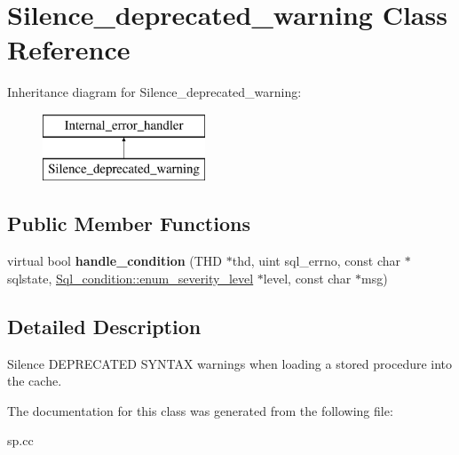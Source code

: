 \hypertarget{classSilence__deprecated__warning}{}\section{Silence\+\_\+deprecated\+\_\+warning Class Reference}
\label{classSilence__deprecated__warning}
Inheritance diagram for Silence\+\_\+deprecated\+\_\+warning\+:\begin{figure}[H]
\begin{center}
\leavevmode
\includegraphics[height=2.000000cm]{classSilence__deprecated__warning}
\end{center}
\end{figure}
\subsection*{Public Member Functions}
\begin{DoxyCompactItemize}
\item 
\mbox{\label{classSilence__deprecated__warning_aff4c10f32f6e5c0769a23e6e9846396f}} 
virtual bool {\bfseries handle\+\_\+condition} (T\+HD $\ast$thd, uint sql\+\_\+errno, const char $\ast$sqlstate, \mbox{\hyperlink{classSql__condition_ab0602581e19cddb609bfe10c44be4e83}{Sql\+\_\+condition\+::enum\+\_\+severity\+\_\+level}} $\ast$level, const char $\ast$msg)
\end{DoxyCompactItemize}


\subsection{Detailed Description}
Silence D\+E\+P\+R\+E\+C\+A\+T\+ED S\+Y\+N\+T\+AX warnings when loading a stored procedure into the cache. 

The documentation for this class was generated from the following file\+:\begin{DoxyCompactItemize}
\item 
sp.\+cc\end{DoxyCompactItemize}
